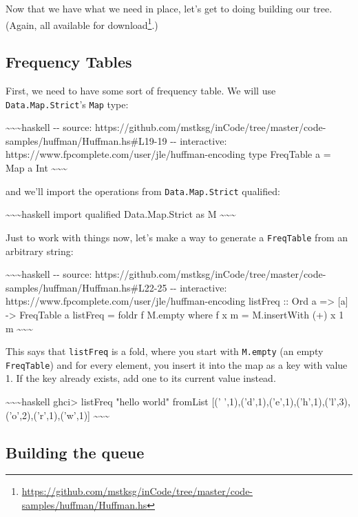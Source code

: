 \documentclass[]{article}
\renewcommand{\href}[2]{#2\footnote{\url{#1}}}
\begin{document}
Now that we have what we need in place, let's get to doing building our tree.
(Again, all available
\href{https://github.com/mstksg/inCode/tree/master/code-samples/huffman/Huffman.hs}{for
download}.)

\subsection{Frequency Tables}

First, we need to have some sort of frequency table. We will use
\texttt{Data.Map.Strict}'s \texttt{Map} type:

\textasciitilde{}\textasciitilde{}\textasciitilde{}haskell -\/- source:
https://github.com/mstksg/inCode/tree/master/code-samples/huffman/Huffman.hs\#L19-19
-\/- interactive: https://www.fpcomplete.com/user/jle/huffman-encoding type
FreqTable a = Map a Int \textasciitilde{}\textasciitilde{}\textasciitilde{}

and we'll import the operations from \texttt{Data.Map.Strict} qualified:

\textasciitilde{}\textasciitilde{}\textasciitilde{}haskell import qualified
Data.Map.Strict as M \textasciitilde{}\textasciitilde{}\textasciitilde{}

Just to work with things now, let's make a way to generate a \texttt{FreqTable}
from an arbitrary string:

\textasciitilde{}\textasciitilde{}\textasciitilde{}haskell -\/- source:
https://github.com/mstksg/inCode/tree/master/code-samples/huffman/Huffman.hs\#L22-25
-\/- interactive: https://www.fpcomplete.com/user/jle/huffman-encoding listFreq
:: Ord a =\textgreater{} {[}a{]} -\textgreater{} FreqTable a listFreq = foldr f
M.empty where f x m = M.insertWith (+) x 1 m
\textasciitilde{}\textasciitilde{}\textasciitilde{}

This says that \texttt{listFreq} is a fold, where you start with
\texttt{M.empty} (an empty \texttt{FreqTable}) and for every element, you insert
it into the map as a key with value 1. If the key already exists, add one to its
current value instead.

\textasciitilde{}\textasciitilde{}\textasciitilde{}haskell ghci\textgreater{}
listFreq "hello world" fromList {[}('
',1),('d',1),('e',1),('h',1),('l',3),('o',2),('r',1),('w',1){]}
\textasciitilde{}\textasciitilde{}\textasciitilde{}

\subsection{Building the queue}
\end{document}
